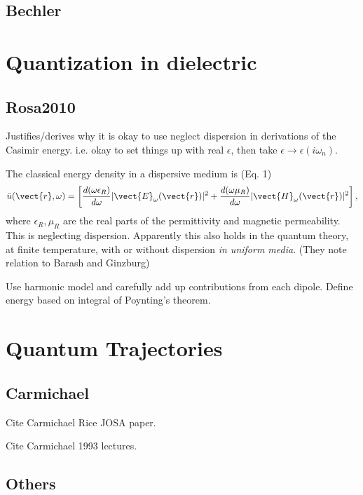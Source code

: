 \subsection{Bechler}

\cite{Bechler1999}
\cite{Bechler2006}

\section{Quantization in dielectric}


\subsection{Rosa2010}

Justifies/derives why it is okay to use neglect dispersion in derivations
of the Casimir energy.  i.e. okay to set things up with real $\epsilon$,
then take $\epsilon\rightarrow\epsilon(i\omega_n)$.  \cite{Rosa2010}

The classical energy density in a dispersive medium is (Eq. 1)
\begin{equation}
  \bar{u}(\vect{r},\omega) = 
  \left[\frac{d(\omega\epsilon_R)}{d\omega}|\vect{E}_\omega(\vect{r})|^2 +
    \frac{d(\omega\mu_R)}{d\omega}|\vect{H}_\omega(\vect{r})|^2\right],
\end{equation}
where $\epsilon_R,\mu_R$ are the real parts of the permittivity and magnetic 
permeability.  This is neglecting dispersion. 
Apparently this also holds in the quantum theory, at finite temperature,
with or without dispersion \emph{in uniform media}.  
(They note relation to Barash and Ginzburg)

Use harmonic model and carefully add up contributions from each dipole.
Define energy based on integral of Poynting's theorem.  


\section{Quantum Trajectories}

\subsection{Carmichael}
Cite Carmichael Rice JOSA paper.\cite{Carmichael1989,Carmichael1991}

Cite Carmichael 1993 lectures. \cite{Carmichael1993}

\subsection{Others}

